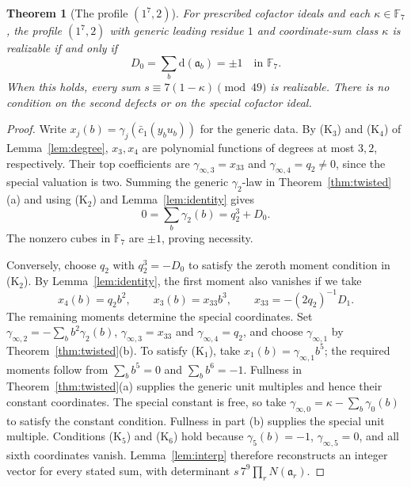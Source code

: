 \documentclass[11pt]{amsart}
\theoremstyle{plain}
\newtheorem{theorem}{Theorem}[section]
\theoremstyle{definition}
\numberwithin{equation}{section}
\newcommand{\F}{\mathbb F}
\newcommand{\dd}{\mathrm d}
\begin{document}
\begin{theorem}[The profile $(1^7,2)$]\label{thm:crit10}
For prescribed cofactor ideals and each $\kappa\in\F_7$, the profile
$(1^7,2)$ with generic leading residue $1$ and coordinate-sum class
$\kappa$ is realizable if and only if
\[
 D_0=\sum_b\dd(\mathfrak a_b)=\pm1\quad\text{in }\F_7.
\]
When this holds, every sum $s\equiv7(1-\kappa)\pmod{49}$ is
realizable. There is no condition on the second defects or on
the special cofactor ideal.
\end{theorem}

\begin{proof}
Write $x_j(b)=\gamma_j(\bar c_1(y_bu_b))$ for the generic data.
By (K$_3$) and (K$_4$) of Lemma~\ref{lem:degree}, $x_3,x_4$ are
polynomial functions of degrees at most $3,2$, respectively.
Their top coefficients are $\gamma_{\infty,3}=x_{33}$ and
$\gamma_{\infty,4}=q_2\ne0$, since the special valuation is two.
Summing the generic $\gamma_2$-law in Theorem~\ref{thm:twisted}(a)
and using (K$_2$) and Lemma~\ref{lem:identity} gives
\[
 0=\sum_b\gamma_2(b)=q_2^3+D_0.
\]
The nonzero cubes in $\F_7$ are $\pm1$, proving necessity.

Conversely, choose $q_2$ with $q_2^3=-D_0$ to satisfy the zeroth
moment condition in (K$_2$). By Lemma~\ref{lem:identity}, the first
moment also vanishes if we take
\[
 x_4(b)=q_2b^2,\qquad x_3(b)=x_{33}b^3,\qquad
 x_{33}=-(2q_2)^{-1}D_1.
\]
The remaining moments determine the special coordinates. Set
$\gamma_{\infty,2}=-\sum_b b^2\gamma_2(b)$,
$\gamma_{\infty,3}=x_{33}$ and $\gamma_{\infty,4}=q_2$, and choose
$\gamma_{\infty,1}$ by Theorem~\ref{thm:twisted}(b). To satisfy
(K$_1$), take $x_1(b)=\gamma_{\infty,1}b^5$; the required moments
follow from $\sum_b b^5=0$ and $\sum_b b^6=-1$.
Fullness in Theorem~\ref{thm:twisted}(a) supplies the generic unit
multiples and hence their constant coordinates. The special
constant is free, so take
$\gamma_{\infty,0}=\kappa-\sum_b\gamma_0(b)$ to satisfy the
constant condition. Fullness in part (b) supplies the special unit
multiple. Conditions (K$_5$) and (K$_6$) hold
because $\gamma_5(b)=-1$, $\gamma_{\infty,5}=0$, and all sixth
coordinates vanish. Lemma~\ref{lem:interp} therefore reconstructs
an integer vector for every stated sum, with determinant
$s\,7^9\prod_rN(\mathfrak a_r)$.
\end{proof}
\end{document}
